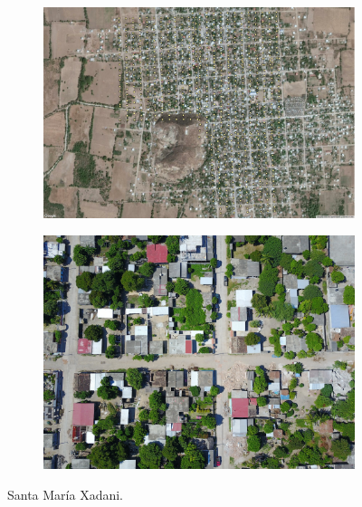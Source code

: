 \begin{figure}[!h]
  \centering
    \begin{subfigure}{.8\textwidth}
        \includegraphics[width=\textwidth]{images/santamaria-satellite.jpg}
    \end{subfigure}
    \begin{subfigure}{.8\textwidth}
        \includegraphics[width=\textwidth]{images/santamaria-sample.jpg}
    \end{subfigure}
  \caption{Santa Mar\'ia Xadani.}
  \label{fig:santamaria}
\end{figure}

